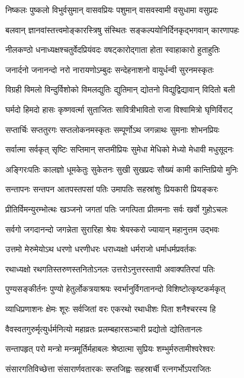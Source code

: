 \twolineshloka
{निष्कलः पुष्कलो विभुर्वसुमान् वासवप्रियः}
{पशुमान् वासवस्वामी वसुधामा वसुप्रदः}%

\twolineshloka
{बलवान् ज्ञानवांस्तत्त्वमोङ्कारस्त्रिषु संस्थितः}
{सङ्कल्पयोनिर्दिनकृद्भगवान् कारणापहः}%

\twolineshloka
{नीलकण्ठो धनाध्यक्षश्चतुर्वेदप्रियंवदः}
{वषट्कारोद्गाता होता स्वाहाकारो हुताहुतिः}%

\twolineshloka
{जनार्दनो जनानन्दो नरो नारायणोऽम्बुदः}
{सन्देहनाशनो वायुर्धन्वी सुरनमस्कृतः}%

\twolineshloka
{विग्रही विमलो विन्दुर्विशोको विमलद्युतिः}
{द्युतिमान् द्योतनो विद्युद्विद्यावान् विदितो बली}%

\twolineshloka
{घर्मदो हिमदो हासः कृष्णवर्त्मा सुताजितः}
{सावित्रीभावितो राजा विश्वामित्रो घृणिर्विराट्}%

\twolineshloka
{सप्तार्चिः सप्ततुरगः सप्तलोकनमस्कृतः}
{सम्पूर्णोऽथ जगन्नाथः सुमनाः शोभनप्रियः}%

\twolineshloka
{सर्वात्मा सर्वकृत् सृष्टिः सप्तिमान् सप्तमीप्रियः}
{सुमेधा मेधिको मेध्यो मेधावी मधुसूदनः}%

\twolineshloka
{अङ्गिरःपतिः कालज्ञो धूमकेतुः सुकेतनः}
{सुखी सुखप्रदः सौख्यं कामी कान्तिप्रियो मुनिः}%

\twolineshloka
{सन्तापनः सन्तपन आतपस्तपसां पतिः}
{उमापतिः सहस्रांशुः प्रियकारी प्रियङ्करः}%

\twolineshloka
{प्रीतिर्विमन्युरम्भोत्थः खञ्जनो जगतां पतिः}
{जगत्पिता प्रीतमनाः सर्वः खर्वो गुहोऽचलः}%

\twolineshloka
{सर्वगो जगदानन्दो जगन्नेता सुरारिहा}
{श्रेयः श्रेयस्करो ज्यायान् महानुत्तम उद्भवः}%

\twolineshloka
{उत्तमो मेरुमेयोऽथ धरणो धरणीधरः}
{धराध्यक्षो धर्मराजो धर्माधर्मप्रवर्तकः}%

\twolineshloka
{रथाध्यक्षो रथगतिस्तरुणस्तनितोऽनलः}
{उत्तरोऽनुत्तरस्तापी अवाक्पतिरपां पतिः}%

\twolineshloka
{पुण्यसङ्कीर्तनः पुण्यो हेतुर्लोकत्रयाश्रयः}
{स्वर्भानुर्विगतानन्दो विशिष्टोत्कृष्टकर्मकृत्}%

\twolineshloka
{व्याधिप्रणाशनः क्षेमः शूरः सर्वजितां वरः}
{एकरथो रथाधीशः पिता शनैश्चरस्य हि}%

\twolineshloka
{वैवस्वतगुरुर्मृत्युर्धर्मनित्यो महाव्रतः}
{प्रलम्बहारसञ्चारी प्रद्योतो द्योतितानलः}%

\twolineshloka
{सन्तापहृत् परो मन्त्रो मन्त्रमूर्तिर्महाबलः}
{श्रेष्ठात्मा सुप्रियः शम्भुर्मरुतामीश्वरेश्वरः}%

\twolineshloka
{संसारगतिविच्छेत्ता संसारार्णवतारकः}
{सप्तजिह्वः सहस्रार्ची रत्नगर्भोऽपराजितः}%

